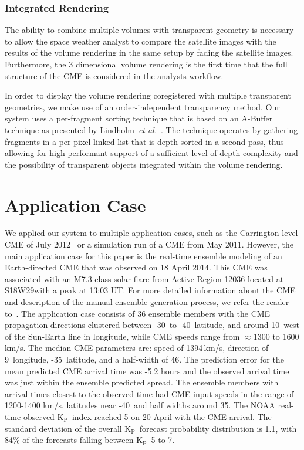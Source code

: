 \documentclass[journal]{vgtc}                %
\def\etal{\textit{et al.}}
\def\etal{\textit{et al.}}
\newcommand{\kpIndex}{$\textrm{K}_\textrm{P}$}
\begin{document}
\subsubsection{Integrated Rendering} \label{sec:integration}
The ability to combine multiple volumes with transparent geometry is necessary to allow the space weather analyst to compare the satellite images with the results of the volume rendering in the same setup by fading the satellite images. Furthermore, the 3 dimensional volume rendering is the first time that the full structure of the CME is considered in the analysts workflow.

In order to display the volume rendering coregistered with multiple transparent geometries, we make use of an order-independent transparency method. Our system uses a per-fragment sorting technique that is based on an A-Buffer technique as presented by Lindholm~\etal~\cite{Lindholm:2014fm}. The technique operates by gathering fragments in a per-pixel linked list that is depth sorted in a second pass, thus allowing for high-performant support of a sufficient level of depth complexity and the possibility of transparent objects integrated within the volume rendering. 

\section{Application Case} \label{sec:applicationcase}
We applied our system to multiple application cases, such as the Carrington-level CME of July 2012~\cite{baker2013major} or a simulation run of a CME from May 2011. However, the main application case for this paper is the real-time ensemble modeling of an Earth-directed CME that was observed on 18 April 2014. This CME was associated with an M7.3 class solar flare from Active Region 12036 located at S18\degree W29\degree with a peak at 13:03 UT. For more detailed information about the CME and description of the manual ensemble generation process, we refer the reader to~\cite{mays2015ensemble}. The application case consists of 36 ensemble members with the CME propagation directions clustered between -30\degree\ to -40\degree\ latitude, and around 10\degree\ west of the Sun-Earth line in longitude, while CME speeds range from $\approx$1300 to 1600 km/s. The median CME parameters are: speed of 1394\,km/s, direction of 9\degree\ longitude, -35\degree\ latitude, and a half-width of 46\degree . The prediction error for the mean predicted CME arrival time was -5.2 hours and the observed arrival time was just within the ensemble predicted spread. The ensemble members with arrival times closest to the observed time had CME input speeds in the range of 1200-1400 km/s, latitudes near -40\degree\ and half widths around 35\degree . The NOAA real-time observed \kpIndex\ index reached 5 on 20 April with the CME arrival. The standard deviation of the overall \kpIndex\ forecast probability distribution is 1.1, with 84\% of the forecasts falling between \kpIndex\ 5 to 7.
\end{document}
